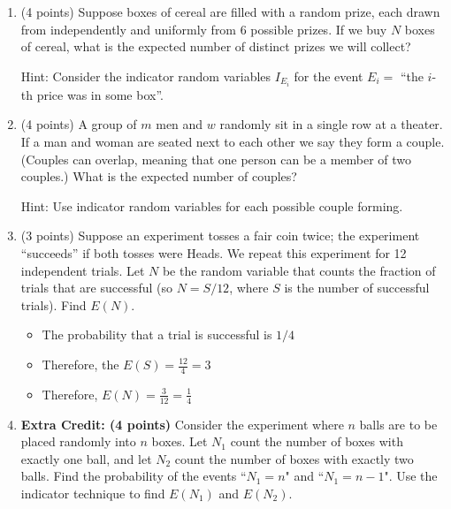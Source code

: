 \documentclass[11pt]{article}
\begin{document}
\begin{enumerate}
\item (4 points) Suppose boxes of cereal are filled with a random prize,
each drawn from independently and uniformly from $6$ possible prizes.
If we buy $N$ boxes of cereal, what is the expected number of distinct
prizes we will collect? \begin{small}\textsf{Hint: Consider the indicator
random variables $I_{E_i}$ for the event $E_i =$ ``the $i$-th price was
in some box''.}\end{small}

\item (4 points) A group of $m$ men and $w$ randomly sit in a single row at a
theater.  If a man and woman are seated next to each other we say they form a
couple.  (Couples can overlap, meaning that one person can be a member of two
couples.)  What is the expected number of couples?
\begin{small}\textsf{Hint: Use indicator
random variables for each possible couple forming.
}\end{small}

\item (3 points) Suppose an experiment tosses a fair coin twice;  the experiment
``succeeds'' if both tosses were Heads.  We repeat this experiment 
for 12 independent trials.  Let $N$ be the random variable that counts
the fraction of trials that are successful (so $N = S/12$, where
$S$ is the number of successful trials).  Find $E(N)$.

\begin{itemize}
	\item The probability that a trial is successful is $1/4$
	\item Therefore, the $E(S) = \frac{12}{4} = 3$
	\item Therefore, $E(N) = \frac{3}{12} = \frac{1}{4}$
\end{itemize}

\item \textbf{Extra Credit: (4 points)} Consider the experiment where $n$ balls
are to be placed randomly into $n$ boxes. Let $N_1$ count the number of boxes
with exactly one ball, and let $N_2$ count the number of boxes with exactly two
balls. Find the probability of the events ``$N_1 = n$" and ``$N_1 = n - 1$".
Use the indicator technique to find $E(N_1)$ and $E(N_2)$.


\end{enumerate}
\end{document}
